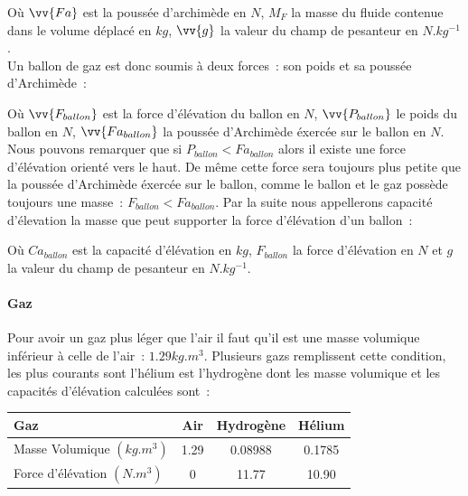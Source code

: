 \documentclass[a4paper,11pt]{article}
\begin{document}
Où $\vv{Fa}$ est la poussée d'archimède en $N$, $M_F$ la masse du fluide contenue dans le volume déplacé en $kg$, $\vv{g}$ la valeur du champ de pesanteur en $N.kg^{-1}$. \\

Un ballon de gaz est donc soumis à deux forces~: son poids et sa poussée d'Archimède~:

\begin{center}
\end{center}

Où $\vv{F_{ballon}}$ est la force d'élévation du ballon en $N$, $\vv{P_{ballon}}$ le poids du ballon en $N$, $\vv{Fa_{ballon}}$ la poussée d'Archimède éxercée sur le ballon en $N$. \\

Nous pouvons remarquer que si $P_{ballon} < Fa_{ballon}$ alors il existe une force d'élévation orienté vers le haut. De même cette force sera toujours  plus petite que la poussée d'Archimède éxercée sur le ballon, comme le ballon et le gaz possède toujours une masse~: $F_{ballon} < Fa_{ballon}$.
Par la suite nous appellerons capacité d'élevation la masse que peut supporter la force d'élévation d'un ballon~:
\begin{center}
\end{center}

Où $Ca_{ballon}$ est la capacité d'élévation en $kg$, $F_{ballon}$ la force d'élévation en $N$ et $g$ la valeur du champ de pesanteur en $N.kg^{-1}$.

\paragraph{Gaz}

Pour avoir un gaz plus léger que l'air il faut qu'il est une masse volumique inférieur à celle de l'air~: $1.29kg.m^3$. Plusieurs gazs remplissent cette condition, les plus courants sont l'hélium est l'hydrogène dont les masse volumique et les capacités d'élévation calculées sont~:

\begin{center}
	\begin{tabular}{|l|c|c|c|}
		\hline
		Gaz & Air & Hydrogène & Hélium \\
		\hline
		Masse Volumique $(kg.m^3)$ & 1.29 & 0.08988 & 0.1785 \\
		\hline
		Force d'élévation $(N.m^3)$ & 0 & 11.77 & 10.90 \\
		\hline
	\end{tabular}
\end{center}
\end{document}
